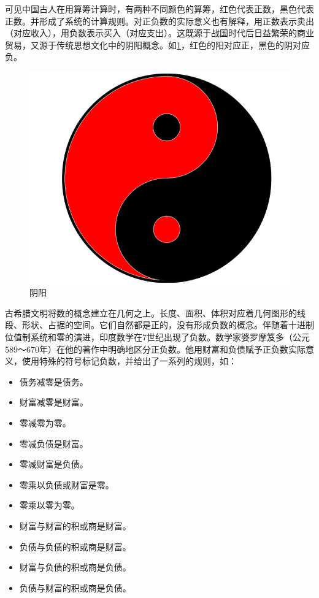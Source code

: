 \documentclass[b5paper]{ctexart}
\begin{document}
可见中国古人在用算筹计算时，有两种不同颜色的算筹，红色代表正数，黑色代表正数。并形成了系统的计算规则。对正负数的实际意义也有解释，用正数表示卖出（对应收入），用负数表示买入（对应支出）。这既源于战国时代后日益繁荣的商业贸易，又源于传统思想文化中的阴阳概念。如\cref{fig:yinyang}，红色的阳对应正，黑色的阴对应负。

\begin{figure}[htbp]
 \centering
 \includegraphics[scale=0.1]{img/yinyang}
 \caption{阴阳}
 \label{fig:yinyang}
\end{figure}

古希腊文明将数的概念建立在几何之上。长度、面积、体积对应着几何图形的线段、形状、占据的空间。它们自然都是正的，没有形成负数的概念。伴随着十进制位值制系统和零的演进，印度数学在7世纪出现了负数。数学家婆罗摩笈多（公元589～670年）在他的著作中明确地区分正负数。他用财富和负债赋予正负数实际意义，使用特殊的符号标记负数，并给出了一系列的规则，如\cite{Rogers-2011}：

\begin{itemize}
\item 债务减零是债务。
\item 财富减零是财富。
\item 零减零为零。
\item 零减负债是财富。
\item 零减财富是负债。
\item 零乘以负债或财富是零。
\item 零乘以零为零。
\item 财富与财富的积或商是财富。
\item 负债与负债的积或商是财富。
\item 财富与负债的积或商是负债。
\item 负债与财富的积或商是负债。
\end{itemize}
\end{document}
